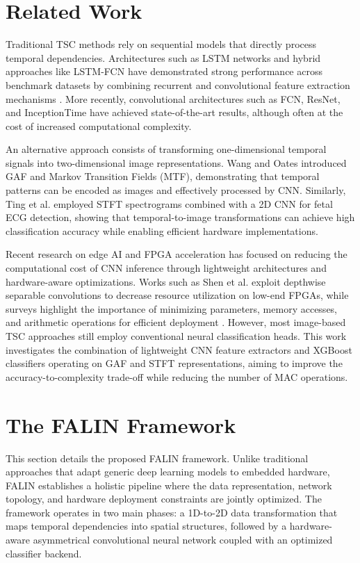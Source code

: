 \documentclass[10pt,conference]{IEEEtran}
\begin{document}
\section{Related Work}
\label{sec:related}

Traditional TSC methods rely on sequential models that directly process temporal dependencies. Architectures such as LSTM networks and hybrid approaches like LSTM-FCN have demonstrated strong performance across benchmark datasets by combining recurrent and convolutional feature extraction mechanisms \cite{karim2018lstm}. More recently, convolutional architectures such as FCN, ResNet, and InceptionTime have achieved state-of-the-art results, although often at the cost of increased computational complexity.

An alternative approach consists of transforming one-dimensional temporal signals into two-dimensional image representations. Wang and Oates \cite{wang2015imaging} introduced GAF and Markov Transition Fields (MTF), demonstrating that temporal patterns can be encoded as images and effectively processed by CNN. Similarly, Ting et al. \cite{ting2021implementation} employed STFT spectrograms combined with a 2D CNN for fetal ECG detection, showing that temporal-to-image transformations can achieve high classification accuracy while enabling efficient hardware implementations.

Recent research on edge AI and FPGA acceleration has focused on reducing the computational cost of CNN inference through lightweight architectures and hardware-aware optimizations. Works such as Shen et al. \cite{shen2025efficient} exploit depthwise separable convolutions to decrease resource utilization on low-end FPGAs, while surveys highlight the importance of minimizing parameters, memory accesses, and arithmetic operations for efficient deployment \cite{diaconu2025survey}. However, most image-based TSC approaches still employ conventional neural classification heads. This work investigates the combination of lightweight CNN feature extractors and XGBoost classifiers operating on GAF and STFT representations, aiming to improve the accuracy-to-complexity trade-off while reducing the number of MAC operations.

\section{The FALIN Framework}
\label{sec:falin}

This section details the proposed FALIN framework. Unlike traditional approaches that adapt generic deep learning models to embedded hardware, FALIN establishes a holistic pipeline where the data representation, network topology, and hardware deployment constraints are jointly optimized. The framework operates in two main phases: a 1D-to-2D data transformation that maps temporal dependencies into spatial structures, followed by a hardware-aware asymmetrical convolutional neural network coupled with an optimized classifier backend.
\end{document}
